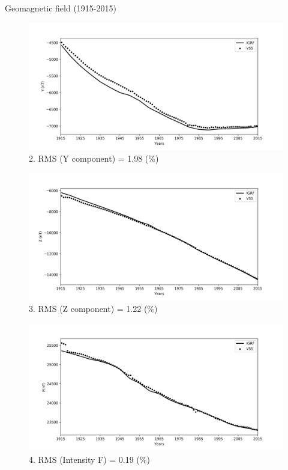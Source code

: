 \documentclass[final,t]{beamer}
\begin{document}
\begin{columns}[t]
\begin{column}{.66\linewidth}
\begin{columns}
\begin{column}{.31\linewidth}
\begin{block}{Geomagnetic field (1915-2015)}
\begin{figure}
	\centering
	\includegraphics[width=1.0\linewidth]{Y}
	\caption{2. RMS (Y component) = 1.98 (\%)}
	\label{y}
\end{figure}

\begin{figure}
	\centering
	\includegraphics[width=1.0\linewidth]{Z}
	\caption{3. RMS (Z component) = 1.22 (\%)}
	\label{z}
\end{figure}

\begin{figure}
	\centering
	\includegraphics[width=1.0\linewidth]{F}
	\caption{4. RMS (Intensity F) = 0.19 (\%)}
	\label{f}
\end{figure}



\end{block}
\end{column}
\end{columns}
\end{column}
\end{columns}
\end{document}
